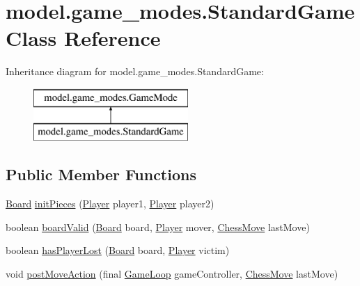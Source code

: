 \hypertarget{classmodel_1_1game__modes_1_1_standard_game}{\section{model.\-game\-\_\-modes.\-Standard\-Game Class Reference}
\label{classmodel_1_1game__modes_1_1_standard_game}
}
Inheritance diagram for model.\-game\-\_\-modes.\-Standard\-Game\-:\begin{figure}[H]
\begin{center}
\leavevmode
\includegraphics[height=2.000000cm]{classmodel_1_1game__modes_1_1_standard_game}
\end{center}
\end{figure}
\subsection*{Public Member Functions}
\begin{DoxyCompactItemize}
\item 
\hyperlink{classmodel_1_1board_1_1_board}{Board} \hyperlink{classmodel_1_1game__modes_1_1_standard_game_af204c61bdf19a90aeef707435a65a4b0}{init\-Pieces} (\hyperlink{classcontroller_1_1_player}{Player} player1, \hyperlink{classcontroller_1_1_player}{Player} player2)
\item 
boolean \hyperlink{classmodel_1_1game__modes_1_1_standard_game_a532a81128fd4292f85774d2ec383bbe5}{board\-Valid} (\hyperlink{classmodel_1_1board_1_1_board}{Board} board, \hyperlink{classcontroller_1_1_player}{Player} mover, \hyperlink{classmodel_1_1_chess_move}{Chess\-Move} last\-Move)
\item 
boolean \hyperlink{classmodel_1_1game__modes_1_1_standard_game_af859966b1b11825d30292cc9a6adf3e4}{has\-Player\-Lost} (\hyperlink{classmodel_1_1board_1_1_board}{Board} board, \hyperlink{classcontroller_1_1_player}{Player} victim)
\item 
void \hyperlink{classmodel_1_1game__modes_1_1_standard_game_ac71e444bda1320574ddf4be97724dbb6}{post\-Move\-Action} (final \hyperlink{classcontroller_1_1_game_loop}{Game\-Loop} game\-Controller, \hyperlink{classmodel_1_1_chess_move}{Chess\-Move} last\-Move)
\end{DoxyCompactItemize}


